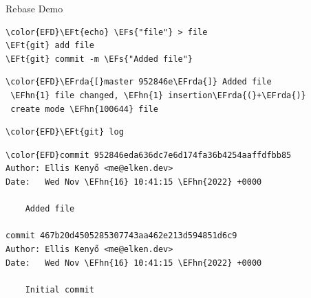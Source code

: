 \documentclass[presentation]{beamer}
\newcommand{\EFs}[1]{\textcolor{EFs}{#1}} %
\newcommand{\EFt}[1]{\textcolor{EFt}{#1}} %
\newcommand{\EFhn}[1]{\textcolor{EFhn}{\textbf{#1}}} %
\newcommand{\EFrda}[1]{\textcolor{EFrda}{#1}} %
\begin{document}
\begin{frame}[label={sec:orgdb0a822},fragile,shrink=40]{Rebase Demo}
 \begin{Code}
\begin{Verbatim}
\color{EFD}\EFt{echo} \EFs{"file"} > file
\EFt{git} add file
\EFt{git} commit -m \EFs{"Added file"}
\end{Verbatim}
\end{Code}

\begin{Code}
\begin{Verbatim}
\color{EFD}\EFrda{[}master 952846e\EFrda{]} Added file
 \EFhn{1} file changed, \EFhn{1} insertion\EFrda{(}+\EFrda{)}
 create mode \EFhn{100644} file
\end{Verbatim}
\end{Code}

\begin{Code}
\begin{Verbatim}
\color{EFD}\EFt{git} log
\end{Verbatim}
\end{Code}

\begin{Code}
\begin{Verbatim}
\color{EFD}commit 952846eda636dc7e6d174fa36b4254aaffdfbb85
Author: Ellis Kenyő <me@elken.dev>
Date:   Wed Nov \EFhn{16} 10:41:15 \EFhn{2022} +0000

    Added file

commit 467b20d4505285307743aa462e213d594851d6c9
Author: Ellis Kenyő <me@elken.dev>
Date:   Wed Nov \EFhn{16} 10:41:15 \EFhn{2022} +0000

    Initial commit
\end{Verbatim}
\end{Code}

\end{frame}
\end{document}
